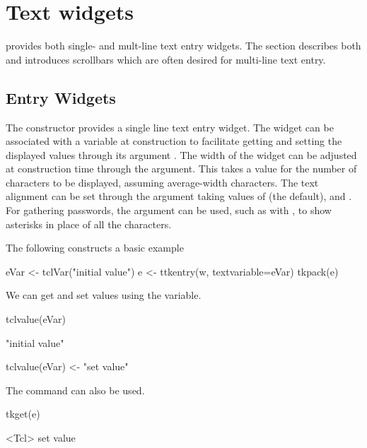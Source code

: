 \section{Text widgets}
\label{sec:tcltk:text-widgets}
\Tk\/ provides both single- and mult-line text entry widgets. The section describes both and introduces scrollbars which are often desired for multi-line text entry.

\subsection{Entry Widgets}
\label{sec:tcltk:entry-widgets}

The  constructor provides a single line text
entry widget. The widget can be associated with a \TCL\/ variable at
construction to facilitate getting and setting the displayed values
through its argument . The width of
the widget can be adjusted at construction time through the
 argument. This takes a value for the number
of characters to be displayed, assuming average-width characters.  The
text alignment can be set through the 
argument taking values of  (the default), 
and . For gathering passwords, the argument
 can be used, such as with
\qcode{*}, to show asterisks in place of all the
characters.

The following constructs a basic example
\begin{Schunk}
\begin{Sinput}
 eVar <- tclVar("initial value")
 e <- ttkentry(w, textvariable=eVar)
 tkpack(e)
\end{Sinput}
\end{Schunk}

We can get and set values using the \TCL\/ variable.
\begin{Schunk}
\begin{Sinput}
 tclvalue(eVar)
\end{Sinput}
\begin{Soutput}
[1] "initial value"
\end{Soutput}
\begin{Sinput}
 tclvalue(eVar) <- "set value"
\end{Sinput}
\end{Schunk}

The  command can also be used.
\begin{Schunk}
\begin{Sinput}
 tkget(e)
\end{Sinput}
\begin{Soutput}
<Tcl> set value 
\end{Soutput}
\end{Schunk}

